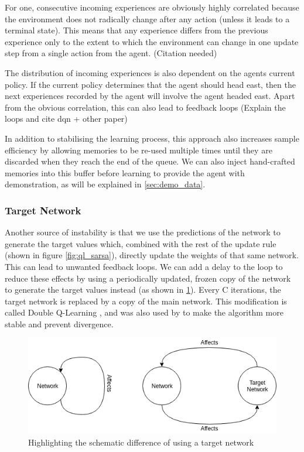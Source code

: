 For one, consecutive incoming experiences are obviously highly correlated because the environment does not radically change after any action (unless it leads to a terminal state). This means that any experience differs from the previous experience only to the extent to which the environment can change in one update step from a single action from the agent. (Citation needed)

The distribution of incoming experiences is also dependent on the agents current policy. If the current policy determines that the agent should head east, then the next experiences recorded by the agent will involve the agent headed east. Apart from the obvious correlation, this can also lead to feedback loops (Explain the loops and cite dqn + other paper)



In addition to stabilising the learning process, this approach also increases sample efficiency by allowing memories to be re-used multiple times until they are discarded when they reach the end of the queue. We can also inject hand-crafted memories into this buffer before learning to provide the agent with demonstration, as will be explained in \ref{sec:demo_data}.


\subsubsection{Target Network}\label{sec:target_network}
Another source of instability is that we use the predictions of the network to generate the target values which, combined with the rest of the update rule (shown in figure \ref{fig:ql_sarsa}), directly update the weights of that same network. This can lead to unwanted feedback loops. We can add a delay to the loop to reduce these effects by using a periodically updated, frozen copy of the network to generate the target values instead (as shown in \ref{fig:targetnet}). Every C iterations, the target network is replaced by a copy of the main network. This modification is called Double Q-Learning \citep{hasselt2010double}, and was also used by \citep{mnih2015human} to make the algorithm more stable and prevent divergence.

\begin{figure}[h]
    \centering
    \includegraphics[width=1\linewidth]{img/Target_Network.png}
    \caption{Highlighting the schematic difference of using a target network}
    \label{fig:targetnet}
\end{figure}


